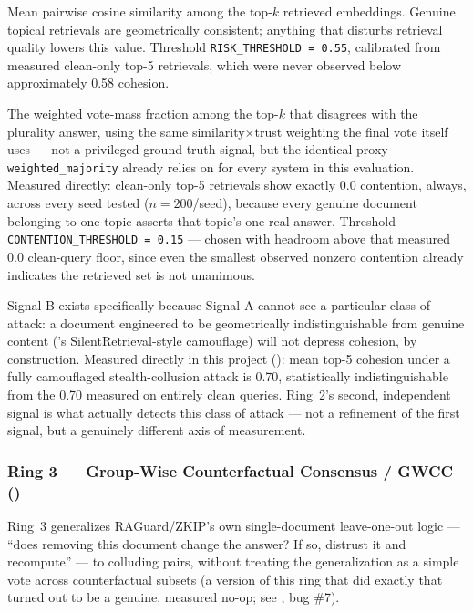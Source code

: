\begin{description}[leftmargin=0pt,style=nextline,font=\bfseries\color{navy}]
\item[Signal A --- Embedding cohesion.] Mean pairwise cosine similarity
  among the top-$k$ retrieved embeddings. Genuine topical retrievals are
  geometrically consistent; anything that disturbs retrieval quality
  lowers this value. Threshold \texttt{RISK\_THRESHOLD = 0.55}, calibrated
  from measured clean-only top-5 retrievals, which were never observed
  below approximately 0.58 cohesion.
\item[Signal B --- Answer contention.] The weighted vote-mass fraction
  among the top-$k$ that disagrees with the plurality answer, using the
  same similarity$\times$trust weighting the final vote itself uses ---
  not a privileged ground-truth signal, but the identical proxy
  \texttt{weighted\_majority} already relies on for every system in this
  evaluation. Measured directly: clean-only top-5 retrievals show exactly
  0.0 contention, always, across every seed tested ($n{=}200$/seed),
  because every genuine document belonging to one topic asserts that
  topic's one real answer. Threshold \texttt{CONTENTION\_THRESHOLD = 0.15}
  --- chosen with headroom above that measured 0.0 clean-query floor,
  since even the smallest observed nonzero contention already indicates
  the retrieved set is not unanimous.
\end{description}

Signal B exists specifically because Signal A cannot see a particular
class of attack: a document engineered to be geometrically
indistinguishable from genuine content ('s
SilentRetrieval-style camouflage) will not depress cohesion, by
construction. Measured directly in this project ():
mean top-5 cohesion under a fully camouflaged stealth-collusion attack is
0.70, statistically indistinguishable from the 0.70 measured on entirely
clean queries. Ring~2's second, independent signal is what actually
detects this class of attack --- not a refinement of the first signal,
but a genuinely different axis of measurement.

\subsubsection{Ring 3 --- Group-Wise Counterfactual Consensus / GWCC ()}
\label{sec:ring3}

Ring~3 generalizes RAGuard/ZKIP's own single-document leave-one-out logic
--- ``does removing this document change the answer? If so, distrust it
and recompute'' --- to colluding pairs, without treating the
generalization as a simple vote across counterfactual subsets (a version
of this ring that did exactly that turned out to be a genuine, measured
no-op; see , bug \#7).

